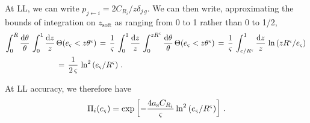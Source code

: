 At LL, we can write \(p_{j \leftarrow i} = 2 C_{R_i} / z \delta_{j\, g}\).
%
We can then write, approximating the bounds of integration on \(z_\text{soft}\) as ranging from 0 to 1 rather than 0 to 1/2,
\begin{align}
    \int_0^R \frac{\dd\theta}{\theta}
    \,
    \int_0^1 \frac{\dd z}{z}
    \,
    &
    \Theta(e_\varsigma < z\theta^\varsigma)
    \,
    =
    \,
    \frac{1}{\varsigma}
    \,
    \int_0^1 \frac{\dd z}{z}
    \,
    \int_0^{z R^\varsigma} \frac{\dd\theta}{\theta}
    \,
    \Theta(e_\varsigma < z\theta^\varsigma)
    \,
    =
    \,
    \frac{1}{\varsigma}
    \,
    \int_{e/R^\varsigma}^1 \frac{\dd z}{z}
    \,
    \ln\left(z R^\varsigma / e_\varsigma\right)
    \,
    \\
    &=
    \,
    \frac{1}{2\,\varsigma}
    \,
    \ln^2\left(e_\varsigma / R^\varsigma\right)
    \,.
\end{align}

\begin{answer}
    At LL accuracy, we therefore have
    \begin{align}
        \Pi_i(e_\varsigma)
        =
        \exp
        \left[
            -\frac{4a_{\mathrm{s}} C_{R_i}}{\varsigma}
            \ln^2\left(e_\varsigma / R^\varsigma\right)
        \right]
        \,.
    \end{align}
\end{answer}


